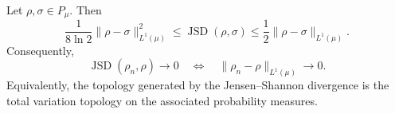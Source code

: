 \documentclass{techbrief}
\begin{document}
\begin{prop}\label{JSDisL1}
	Let $\rho,\sigma\in P_\mu$. Then
	\begin{equation}
		\frac{1}{8\ln 2}\|\rho-\sigma\|_{L^1(\mu)}^2
		\leq
		\operatorname{JSD}(\rho,\sigma)
		\leq
		\frac{1}{2}\|\rho-\sigma\|_{L^1(\mu)}.
	\end{equation}
	Consequently,
	\begin{equation}
		\operatorname{JSD}(\rho_n,\rho)\to0
		\quad\Longleftrightarrow\quad
		\|\rho_n-\rho\|_{L^1(\mu)}\to0.
	\end{equation}
	Equivalently, the topology generated by the Jensen--Shannon divergence is the total variation topology on the associated probability measures.
\end{prop}
\end{document}
